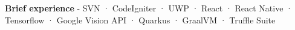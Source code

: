 \begin{cventries}
{\begin{cvitems}
        \item {\textbf{Brief experience} \hspace{0.03cm} - \hspace{0.03cm} SVN \hspace{0.03cm} · \hspace{0.03cm} CodeIgniter \hspace{0.03cm} · \hspace{0.03cm} UWP \hspace{0.03cm} · \hspace{0.03cm} React \hspace{0.03cm} · \hspace{0.03cm} React Native \hspace{0.03cm} · \hspace{0.03cm} Tensorflow \hspace{0.03cm} · \hspace{0.03cm} Google Vision API \hspace{0.03cm} · \hspace{0.03cm} Quarkus \hspace{0.03cm} · \hspace{0.03cm} GraalVM \hspace{0.03cm} · \hspace{0.03cm} Truffle Suite} %
      \end{cvitems}
    }
\end{cventries}